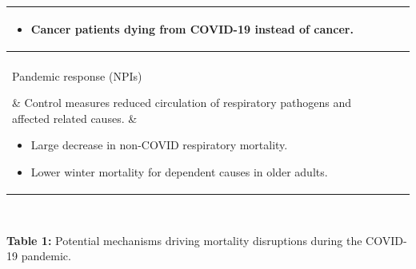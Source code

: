 \documentclass[a0paper,portrait]{baposter}
\newcommand{\compresslist}{
	\setlength{\itemsep}{1pt}
	\setlength{\parskip}{0pt}
	\setlength{\parsep}{0pt}
}
\begin{document}
\begin{poster}
{\begin{minipage}{\linewidth}
\begin{tabular}{p{2.2cm} p{3.6cm} p{4cm}}
\begin{minipage}[t]{4cm}
\begin{itemize}[leftmargin=1em]
\item Cancer patients dying from COVID-19 instead of cancer.
\end{itemize}\end{minipage}\\[1cm]
\hline\\[-0.22cm]
\parbox[t]{2.2cm}{\raggedright Pandemic response (NPIs)} & Control measures reduced circulation of respiratory pathogens and affected related causes. &
\begin{minipage}[t]{4cm}
\begin{itemize}[leftmargin=1em]
\compresslist
\item Large decrease in non-COVID respiratory mortality.
\item Lower winter mortality for dependent causes in older adults.
\end{itemize}\end{minipage}\\[1cm]
\hline
\end{tabular}
\\[0.1cm]
\tiny\parbox[t]{\textwidth}{\textbf{Table 1:}
Potential mechanisms driving mortality disruptions during the COVID-19 pandemic.}
\end{minipage}


}

\end{poster}
\end{document}
